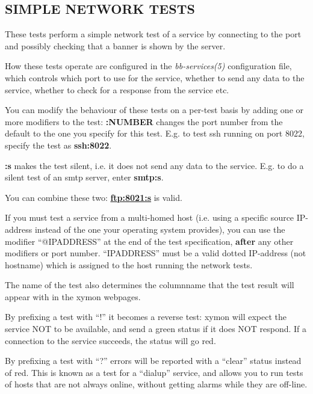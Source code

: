 \subsection{SIMPLE NETWORK TESTS}
 These tests perform a simple network test of a service by connecting
 to the port and possibly checking that a banner is shown by the
 server. 


  How these tests operate are configured in the \emph{bb-services(5)}
  configuration file, which controls which port to use for the
  service, whether to send any data to the service, whether to check
  for a response from the service etc. 



  You can modify the behaviour of these tests on a per-test basis by
  adding one or more modifiers to the test: \textbf{:NUMBER} changes
  the port number from the default to the one you specify for this
  test. E.g. to test ssh running on port 8022, specify the test as
  \textbf{ssh:8022}. 


 \textbf{:s}
 makes the test silent, i.e. it does not send any data to the
 service. E.g. to do a silent test of an smtp server, enter
 \textbf{smtp:s}. 



  You can combine these two: \textbf{\url{ftp:8021:s}}
 is valid. 


  If you must test a service from a multi-homed host (i.e. using a
  specific source IP-address instead of the one your operating system
  provides), you can use the modifier ``@IPADDRESS'' at the end of the
  test specification, \textbf{after} any other modifiers or port
  number. ``IPADDRESS'' must be a valid dotted IP-address (not
  hostname) which is assigned to the host running the network tests. 



  The name of the test also determines the columnname that the test
  result will appear with in the xymon webpages. 



  By prefixing a test with ``!'' it becomes a reverse test: xymon
  will expect the service NOT to be available, and send a green status
  if it does NOT respond. If a connection to the service succeeds, the
  status will go red. 



  By prefixing a test with ``?'' errors will be reported with a
  ``clear'' status instead of red. This is known as a test for a
  ``dialup'' service, and allows you to run tests of hosts that are
  not always online, without getting alarms while they are off-line. 




